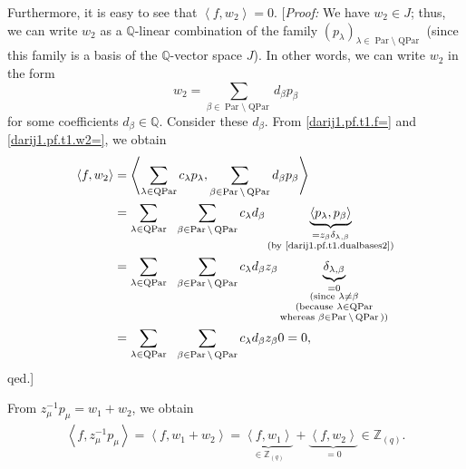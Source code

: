 \documentclass[10pt,a4paper]{article}
\begin{document}
Furthermore, it is easy to see that $\left\langle f,w_{2}\right\rangle =0$.
[\emph{Proof:} We have $w_{2}\in J$; thus, we can write $w_{2}$ as a $\mathbb{Q}
$-linear combination of the family $\left(  p_{\lambda}\right)  _{\lambda
\in\operatorname{Par}\setminus\operatorname{QPar}}$ (since this family is a
basis of the $\mathbb{Q}$-vector space $J$). In other words, we can write
$w_{2}$ in the form
\begin{equation}
w_{2}=\sum_{\beta\in\operatorname{Par}\setminus\operatorname{QPar}}d_{\beta
}p_{\beta}
\label{darij1.pf.t1.w2=}
\tag{10}
\end{equation}
for some coefficients $d_{\beta}\in\mathbb{Q}$. Consider these $d_{\beta}$.
From \eqref{darij1.pf.t1.f=} and \eqref{darij1.pf.t1.w2=}, we obtain
\begin{align*}
\left\langle f,w_{2}\right\rangle  & =\left\langle \sum_{\lambda
\in\operatorname{QPar}}c_{\lambda}p_{\lambda},\sum_{\beta\in
\operatorname{Par}\setminus\operatorname{QPar}}d_{\beta}p_{\beta
}\right\rangle \\
& =\sum_{\lambda\in\operatorname{QPar}}\ \ \sum_{\beta\in\operatorname{Par}
\setminus\operatorname{QPar}}c_{\lambda}d_{\beta}\underbrace{\left\langle
p_{\lambda},p_{\beta}\right\rangle }_{\substack{=z_{\beta}\delta
_{\lambda,\beta}\\\text{(by \eqref{darij1.pf.t1.dualbases2})}}}\\
& =\sum_{\lambda\in\operatorname{QPar}}\ \ \sum_{\beta\in\operatorname{Par}
\setminus\operatorname{QPar}}c_{\lambda}d_{\beta}z_{\beta}\underbrace{\delta
_{\lambda,\beta}}_{\substack{=0\\\text{(since }\lambda\neq\beta
\\\text{(because }\lambda\in\operatorname{QPar}\\\text{whereas }\beta
\in\operatorname{Par}\setminus\operatorname{QPar}\text{))}}}\\
& =\sum_{\lambda\in\operatorname{QPar}}\ \ \sum_{\beta\in\operatorname{Par}
\setminus\operatorname{QPar}}c_{\lambda}d_{\beta}z_{\beta}0=0,
\end{align*}
qed.]




From $z_{\mu}^{-1}p_{\mu}=w_{1}+w_{2}$, we obtain
\begin{align*}
\left\langle f,z_{\mu}^{-1}p_{\mu}\right\rangle =\left\langle f,w_{1}
+w_{2}\right\rangle =\underbrace{\left\langle f,w_{1}\right\rangle }
_{\in\mathbb{Z}_{\left(  q\right)  }}+\underbrace{\left\langle f,w_{2}
\right\rangle }_{=0}\in\mathbb{Z}_{\left(  q\right)  }.
\end{align*}
\end{document}
